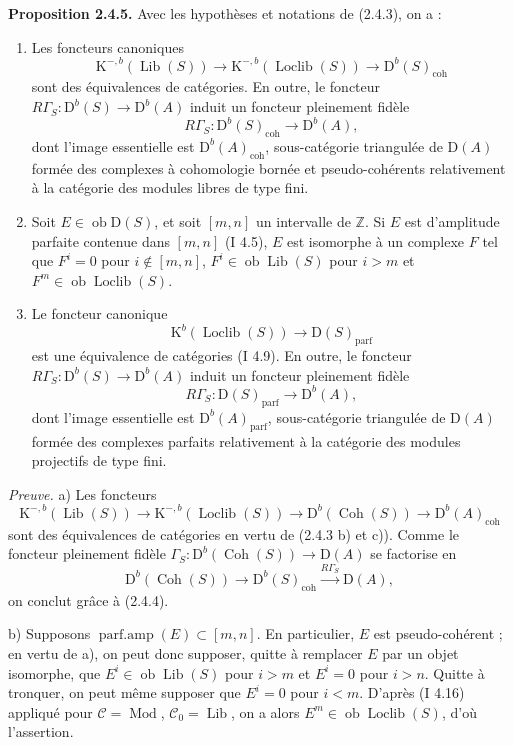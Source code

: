 \documentclass[11pt]{article}
\providecommand{\Mod}{\operatorname{Mod}}
\providecommand{\Lib}{\operatorname{Lib}}
\providecommand{\Loclib}{\operatorname{Loclib}}
\providecommand{\Coh}{\operatorname{Coh}}
\providecommand{\Ob}{\operatorname{ob}}
\providecommand{\coh}{\operatorname{coh}}
\providecommand{\parf}{\operatorname{parf}}
\begin{document}
\textbf{Proposition 2.4.5.} Avec les hypothèses et notations de (2.4.3), on a :
\begin{enumerate}[label=\alph*)]
\item Les foncteurs canoniques
\[
\mathrm K^{-,b}(\Lib(S))\longrightarrow\mathrm K^{-,b}(\Loclib(S))\longrightarrow\mathrm D^b(S)_{\coh}
\]
sont des équivalences de catégories. En outre, le foncteur $R\Gamma_S:\mathrm D^b(S)\to\mathrm D^b(A)$ induit un foncteur pleinement fidèle
\[
R\Gamma_S:\mathrm D^b(S)_{\coh}\longrightarrow\mathrm D^b(A),
\]
dont l'image essentielle est $\mathrm D^b(A)_{\coh}$, sous-catégorie triangulée de $\mathrm D(A)$ formée des complexes à cohomologie bornée et pseudo-cohérents relativement à la catégorie des modules libres de type fini.
\item Soit $E\in\Ob\mathrm D(S)$, et soit $[m,n]$ un intervalle de $\mathbb Z$. Si $E$ est d'amplitude parfaite contenue dans $[m,n]$ (I 4.5), $E$ est isomorphe à un complexe $F$ tel que $F^i=0$ pour $i\notin[m,n]$, $F^i\in\Ob\Lib(S)$ pour $i>m$ et $F^m\in\Ob\Loclib(S)$.
\item Le foncteur canonique
\[
\mathrm K^b(\Loclib(S))\longrightarrow\mathrm D(S)_{\parf}
\]
est une équivalence de catégories (I 4.9). En outre, le foncteur $R\Gamma_S:\mathrm D^b(S)\to\mathrm D^b(A)$ induit un foncteur pleinement fidèle
\[
R\Gamma_S:\mathrm D(S)_{\parf}\longrightarrow\mathrm D^b(A),
\]
dont l'image essentielle est $\mathrm D^b(A)_{\parf}$, sous-catégorie triangulée de $\mathrm D(A)$ formée des complexes parfaits relativement à la catégorie des modules projectifs de type fini.
\end{enumerate}

\emph{Preuve.} a) Les foncteurs
\[
\mathrm K^{-,b}(\Lib(S))\longrightarrow\mathrm K^{-,b}(\Loclib(S))\longrightarrow\mathrm D^b(\Coh(S))\longrightarrow\mathrm D^b(A)_{\coh}
\]
sont des équivalences de catégories en vertu de (2.4.3 b) et c)). Comme le foncteur pleinement fidèle $\Gamma_S:\mathrm D^b(\Coh(S))\to\mathrm D(A)$ se factorise en
\[
\mathrm D^b(\Coh(S))\longrightarrow\mathrm D^b(S)_{\coh}\xrightarrow{R\Gamma_S}\mathrm D(A),
\]
on conclut grâce à (2.4.4).

b) Supposons $\operatorname{parf.amp}(E)\subset[m,n]$. En particulier, $E$ est pseudo-cohérent ; en vertu de a), on peut donc supposer, quitte à remplacer $E$ par un objet isomorphe, que $E^i\in\Ob\Lib(S)$ pour $i>m$ et $E^i=0$ pour $i>n$. Quitte à tronquer, on peut même supposer que $E^i=0$ pour $i<m$. D'après (I 4.16) appliqué pour $\mathcal C=\Mod$, $\mathcal C_0=\Lib$, on a alors $E^m\in\Ob\Loclib(S)$, d'où l'assertion.
\end{document}
